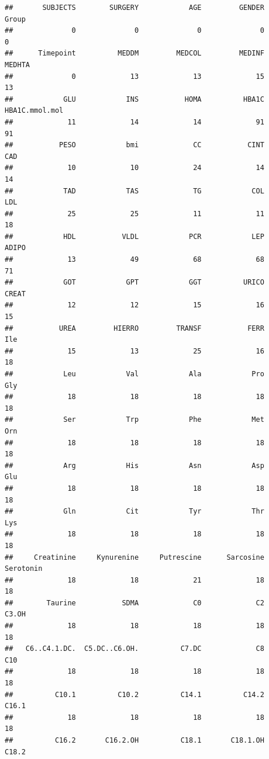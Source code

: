\documentclass[
]{article}
\begin{document}
\begin{verbatim}
##       SUBJECTS        SURGERY            AGE         GENDER          Group 
##              0              0              0              0              0 
##      Timepoint          MEDDM         MEDCOL         MEDINF         MEDHTA 
##              0             13             13             15             13 
##            GLU            INS           HOMA          HBA1C HBA1C.mmol.mol 
##             11             14             14             91             91 
##           PESO            bmi             CC           CINT            CAD 
##             10             10             24             14             14 
##            TAD            TAS             TG            COL            LDL 
##             25             25             11             11             18 
##            HDL           VLDL            PCR            LEP          ADIPO 
##             13             49             68             68             71 
##            GOT            GPT            GGT          URICO          CREAT 
##             12             12             15             16             15 
##           UREA         HIERRO         TRANSF           FERR            Ile 
##             15             13             25             16             18 
##            Leu            Val            Ala            Pro            Gly 
##             18             18             18             18             18 
##            Ser            Trp            Phe            Met            Orn 
##             18             18             18             18             18 
##            Arg            His            Asn            Asp            Glu 
##             18             18             18             18             18 
##            Gln            Cit            Tyr            Thr            Lys 
##             18             18             18             18             18 
##     Creatinine     Kynurenine     Putrescine      Sarcosine      Serotonin 
##             18             18             21             18             18 
##        Taurine           SDMA             C0             C2          C3.OH 
##             18             18             18             18             18 
##   C6..C4.1.DC.  C5.DC..C6.OH.          C7.DC             C8            C10 
##             18             18             18             18             18 
##          C10.1          C10.2          C14.1          C14.2          C16.1 
##             18             18             18             18             18 
##          C16.2       C16.2.OH          C18.1       C18.1.OH          C18.2 

\end{verbatim}
\end{document}
